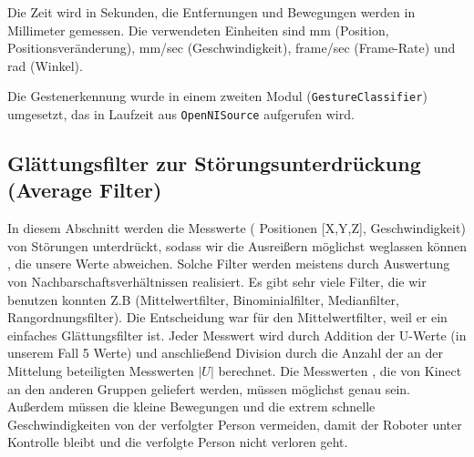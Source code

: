 Die Zeit wird in Sekunden, die Entfernungen und Bewegungen werden in Millimeter gemessen.
 Die verwendeten Einheiten sind mm (Position, Positionsveränderung), mm/sec
 (Geschwindigkeit), frame/sec (Frame-Rate) und rad (Winkel).

Die Gestenerkennung wurde in einem zweiten Modul (\lstinline{GestureClassifier})
umgesetzt, das in Laufzeit aus \lstinline{OpenNISource} aufgerufen wird.


\subsection{Glättungsfilter zur Störungsunterdrückung (Average Filter)}

In diesem Abschnitt werden die Messwerte ( Positionen [X,Y,Z], Geschwindigkeit) von Störungen unterdrückt, sodass wir die  Ausreißern möglichst weglassen  können , die unsere Werte abweichen. Solche Filter werden meistens durch Auswertung von Nachbarschaftsverhältnissen realisiert. 
Es gibt sehr viele Filter, die wir benutzen konnten Z.B (Mittelwertfilter, Binominialfilter, Medianfilter, Rangordnungsfilter). Die Entscheidung war für den Mittelwertfilter, weil er ein einfaches Glättungsfilter ist. Jeder Messwert wird durch Addition der U-Werte (in unserem Fall 5 Werte)  und anschließend Division durch die Anzahl der an der Mittelung beteiligten Messwerten $|U|$ berechnet.
Die Messwerten , die von Kinect an den anderen Gruppen geliefert werden, müssen möglichst genau sein. Außerdem müssen die kleine Bewegungen und die extrem schnelle Geschwindigkeiten von der verfolgter Person vermeiden, damit der Roboter unter Kontrolle bleibt und die verfolgte Person nicht verloren geht.




